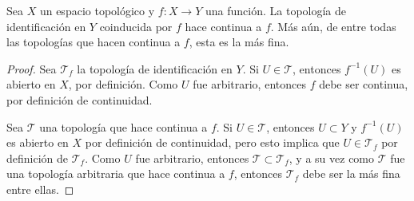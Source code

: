 

\begin{proposition}
Sea $X$ un espacio topológico y $f : X \longrightarrow Y$ una función. La topología de identificación en $Y$ coinducida por $f$ hace continua a $f$. Más aún, de entre todas las topologías que hacen continua a $f$, esta es la más fina.
\end{proposition}

\begin{proof}
Sea $\mathcal{T}_f$ la topología de identificación en $Y$. Si $U \in \mathcal{T}$, entonces $f^{-1}(U)$ es abierto en $X$, por definición. Como $U$ fue arbitrario, entonces $f$ debe ser continua, por definición de continuidad.
\bigskip

Sea $\mathcal{T}$ una topología que hace continua a $f$. Si $U \in \mathcal{T}$, entonces $U \subset Y$ y $f^{-1}(U)$ es abierto en $X$ por definición de continuidad, pero esto implica que $U \in \mathcal{T}_f$ por definición de $\mathcal{T}_f$. Como $U$ fue arbitrario, entonces $\mathcal{T} \subset \mathcal{T}_f$, y a su vez como $\mathcal{T}$ fue una topología arbitraria que hace continua a $f$, entonces $\mathcal{T}_f$ debe ser la más fina entre ellas.
\end{proof}
